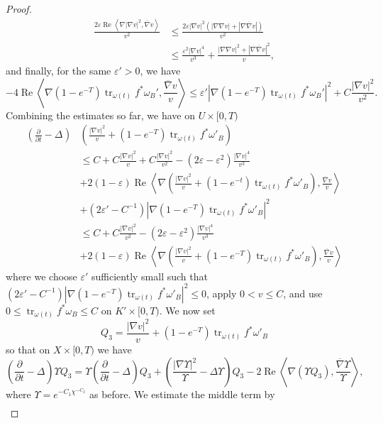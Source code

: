 \documentclass[12pt]{article}
\numberwithin{equation}{section}
\renewcommand{\d}{\partial}
\newcommand{\e}{\varepsilon}
\DeclareMathOperator{\tr}{tr}
\DeclareMathOperator{\Real}{Re}
\newcommand{\oo}[1]{\overline{#1}}
\newcommand{\parabolic}[1]{\left(\frac{\d}{\d t} - \Delta_{#1}\right)}
\newcommand{\ip}[1]{\left\langle#1\right\rangle}
\begin{document}
\begin{proof}
\begin{align*}
    \frac{2\e \Real \ip{\nabla |\nabla v|^2, \oo{\nabla} v}}{v^2} &\leq \frac{2\e |\nabla v|^2 (|\nabla \nabla v| + |\nabla \oo{\nabla} v|)}{v^2} \\
    &\leq \frac{\e^2|\nabla v|^4}{v^3} + \frac{|\nabla \nabla v|^2 + |\nabla \oo{\nabla} v|^2}{v},
\end{align*}
and finally, for the same $\e' > 0$, we have
\begin{equation*}
    - 4 \Real \ip{\nabla (1-e^{-T})\tr_{\omega(t)}f^*\omega_B', \frac{\oo{\nabla} v}{v}} \leq \e'|\nabla(1-e^{-T})\tr_{\omega(t)} f^*\omega_B'|^2 + C \frac{|\nabla v|^2}{v^2}.
\end{equation*}
Combining the estimates so far, we have on $U \times [0,T)$
\begin{align*}
    \parabolic{} &\left(\frac{|\nabla v|^2}{v} + (1-e^{-T})\tr_{\omega(t)} f^*\omega'_B\right)\\
    &\leq C + C\frac{|\nabla v|^2}{v} +C \frac{|\nabla v|^2}{v^2} - (2\e-\e^2)\frac{|\nabla v|^4}{v^3}\\
    &+ 2 (1-\e)\Real \ip{\nabla \left(\frac{|\nabla v|^2}{v}+ (1-e^{-t})\tr_{\omega(t)} f^*\omega'_B \right), \frac{\oo{\nabla} v}{v}}\\
    & + (2\e' - C^{-1}) |\nabla (1-e^{-T})\tr_{\omega(t)} f^*\omega'_B|^2\\
    &\leq C +C \frac{|\nabla v|^2}{v^2} - (2\e-\e^2)\frac{|\nabla v|^4}{v^3}\\
    &+ 2 (1-\e)\Real \ip{\nabla \left(\frac{|\nabla v|^2}{v}+ (1-e^{-T})\tr_{\omega(t)} f^*\omega'_B \right), \frac{\oo{\nabla} v}{v}}
\end{align*}
where we choose $\e'$ sufficiently small such that $(2\e' - C^{-1})|\nabla (1-e^{-T})\tr_{\omega(t)} f^*\omega'_B|^2 \leq 0$, apply $0 < v \leq C$, and use $0 \leq \tr_{\omega(t)} f^*\omega_B \leq C$ on $K' \times [0,T)$. We now set 
\begin{equation*}
    Q_3 = \frac{|\nabla v|^2}{v} + (1-e^{-T})\tr_{\omega(t)} f^*\omega'_B
\end{equation*}
so that on $X \times [0,T)$ we have
\begin{equation*}
    \parabolic{} \Upsilon Q_3 = \Upsilon \parabolic{} Q_3 +\left(\frac{|\nabla \Upsilon|^2}{\Upsilon} -\Delta \Upsilon\right)Q_3 - 2 \Real \ip{\nabla (\Upsilon Q_3), \frac{\oo{\nabla} \Upsilon}{\Upsilon}},
\end{equation*}
where $\Upsilon = e^{-C_1\chi^{-C_2}}$ as before. We estimate the middle term by
\begin{align*}

\end{align*}
\end{proof}
\end{document}
